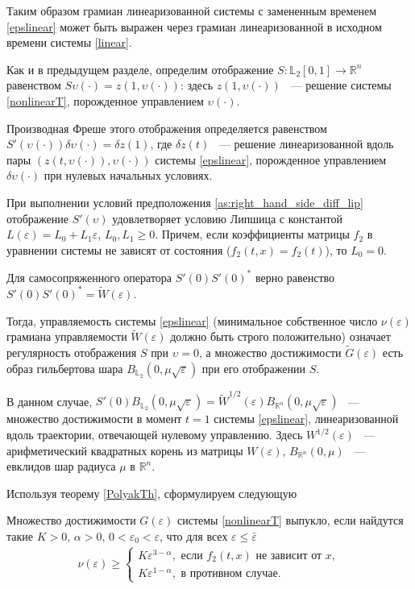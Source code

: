 \documentclass[../main.tex]{subfiles}
\begin{document}
Таким образом грамиан линеаризованной системы с замененным временем \eqref{epslinear} может быть выражен через грамиан линеаризованной в исходном времени системы \eqref{linear}.
    
    
 Как и в предыдущем разделе, определим отображение $S: \mathbb{L}_2[0,1] \rightarrow \mathbb{R}^n $ равенством $S\upsilon(\cdot) = z(1,\upsilon(\cdot))$: здесь $ z(1,\upsilon(\cdot))$ ~--- решение системы \eqref{nonlinearT}, порожденное управлением $\upsilon(\cdot)$. 
 
 Производная Фреше этого отображения определяется равенством $ S'(\upsilon(\cdot))\delta \upsilon(\cdot) = \delta z(1)$, где $\delta z(t)$ ~--- решение линеаризованной вдоль пары $\left( z(t,\upsilon(\cdot)),\upsilon(\cdot)\right)  $ системы \eqref{epslinear}, порожденное управлением $\delta \upsilon(\cdot)$ при нулевых начальных условиях.
 
 
 При выполнении условий предположения \ref{as:right_hand_side_diff_lip} отображение $S'(\upsilon)$ удовлетворяет условию Липшица с константой $L(\varepsilon) = L_0 + L_1\varepsilon$, $ L_0, L_1 \geqslant 0 $. Причем, если коэффициенты матрицы $f_2$ в уравнении системы не зависят от состояния ($f_2(t,x) = f_2(t)$), то $L_0 = 0$. 
  
  Для самосопряженного оператора $S'(0)S'(0)^*$ верно равенство $S'(0)S'(0)^* = \widetilde{W}(\varepsilon)$.
  
   Тогда, управляемость системы \eqref{epslinear} (минимальное собственное число $ \nu(\varepsilon) $ грамиана управляемости $\widetilde{W}(\varepsilon)$ должно быть строго положительно) означает регулярность отображения $S$ при $\upsilon = 0$, а множество достижимости $\widetilde{G}(\varepsilon)$ есть образ гильбертова шара $B_{\mathbb{L}_2}(0,\mu\sqrt{\varepsilon})$ при его отображении $S$.
   
   В данном случае, $S'(0)B_{\mathbb{L}_2}(0,\mu\sqrt{\varepsilon}) = \widetilde{W}^{1/2}(\varepsilon)B_{\mathbb{R}^n}(0,\mu\sqrt{\varepsilon}) $ ~--- множество достижимости в момент $t = 1$ системы \eqref{epslinear}, линеаризованной вдоль траектории, отвечающей нулевому управлению. Здесь $W^{1/2}(\varepsilon)$ ~--- арифметический квадратных корень из матрицы $W(\varepsilon)$, $ B_{\mathbb{R}^n}(0,\mu) $ ~--- евклидов шар радиуса $ \mu $ в $ \mathbb{R}^n $.
 
 Используя теорему \ref{PolyakTh}, сформулируем следующую
 \begin{theorem}\label{ConvexityCond}
 	Множество достижимости $G(\varepsilon)$ системы \eqref{nonlinearT} выпукло, если найдутся такие $K > 0$, $ \alpha > 0$, $ 0 < \varepsilon_0 < \varepsilon$, что для всех $\varepsilon \leqslant \bar{\varepsilon}$
 		\begin{gather}\label{cond}
 			\nu(\varepsilon) \geqslant \left\{ {\begin{array}{*{20}{l}}
 					{K\varepsilon ^{3 - \alpha}, \mbox{\ если \ } f_2(t,x) \mbox{\ не зависит от \ } x}, \\
 					{K\varepsilon ^{1 - \alpha}}, \mbox{\ в противном случае}.
 			\end{array}} \right.
 		\end{gather}
 \end{theorem}
 
\end{document}
